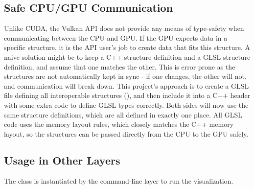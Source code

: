 \subsection{Safe CPU/GPU Communication}\label{sec:Impl:Viz:CPUGPUSafety}
Unlike CUDA, the Vulkan API does not provide any means of type-safety when communicating between the CPU and GPU.
If the GPU expects data in a specific structure, it is the API user's job to create data that fits this structure.
A naive solution might be to keep a C++ structure definition and a GLSL structure definition, and assume that one matches the other.
This is error prone as the structures are not automatically kept in sync - if one changes, the other will not, and communication will break down.
This project's approach is to create a GLSL file defining all interoperable structures (), and then include it into a C++ header with some extra code to define GLSL types correctly.
Both sides will now use the same structure definitions, which are all defined in exactly one place.
All GLSL code uses the  memory layout rules, which closely matches the C++ memory layout, so the structures can be passed directly from the CPU to the GPU safely.

\subsection{Usage in Other Layers}
The  class is instantiated by the command-line layer to run the visualization.